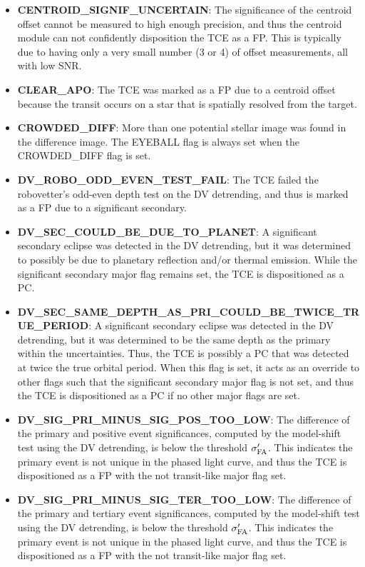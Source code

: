 \begin{itemize}
\item[] \textbf{CENTROID\_SIGNIF\_UNCERTAIN}: The significance of the centroid offset cannot be measured to high enough precision, and thus the centroid module can not confidently disposition the TCE as a FP. This is typically due to having only a very small number (3 or 4) of offset measurements, all with low SNR.
\item[] \textbf{CLEAR\_APO}: The TCE was marked as a FP due to a centroid offset because the transit occurs on a star that is spatially resolved from the target.
\item[] \textbf{CROWDED\_DIFF}: More than one potential stellar image was found in the difference image. The EYEBALL flag is always set when the CROWDED\_DIFF flag is set.
\item[] \textbf{DV\_ROBO\_ODD\_EVEN\_TEST\_FAIL}: The TCE failed the robovetter's odd-even depth test on the DV detrending, and thus is marked as a FP due to a significant secondary.
\item[] \textbf{DV\_SEC\_COULD\_BE\_DUE\_TO\_PLANET}: A significant secondary eclipse was detected in the DV detrending, but it was determined to possibly be due to planetary reflection and/or thermal emission. While the significant secondary major flag remains set, the TCE is dispositioned as a PC.  
\item[] \textbf{DV\_SEC\_SAME\_DEPTH\_AS\_PRI\_COULD\_BE\_TWICE\_TRUE\_PERIOD}: A significant secondary eclipse was detected in the DV detrending, but it was determined to be the same depth as the primary within the uncertainties. Thus, the TCE is possibly a PC that was detected at twice the true orbital period. When this flag is set, it acts as an override to other flags such that the significant secondary major flag is not set, and thus the TCE is dispositioned as a PC if no other major flags are set.
\item[] \textbf{DV\_SIG\_PRI\_MINUS\_SIG\_POS\_TOO\_LOW}: The difference of the primary and positive event significances, computed by the model-shift test using the DV detrending, is below the threshold $\sigma'_{\rm FA}$. This indicates the primary event is not unique in the phased light curve, and thus the TCE is dispositioned as a FP with the not transit-like major flag set.
\item[] \textbf{DV\_SIG\_PRI\_MINUS\_SIG\_TER\_TOO\_LOW}: The difference of the primary and tertiary event significances, computed by the model-shift test using the DV detrending, is below the threshold $\sigma'_{\rm FA}$. This indicates the primary event is not unique in the phased light curve, and thus the TCE is dispositioned as a FP with the not transit-like major flag set.  

\end{itemize}
